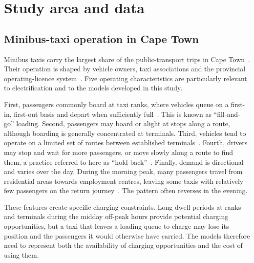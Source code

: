 \documentclass{elsarticle}
\begin{document}

\section{Study area and data}
\label{sec:study_area}

\subsection{Minibus-taxi operation in Cape Town}

Minibus taxis carry the largest share of the public-transport trips in Cape Town~\cite{statssa2022_nhts, coct2023_citp}. Their operation is shaped by vehicle owners, taxi associations and the provincial operating-licence system~\cite{behrens2015_paratransit, vegter2020_sa_mbt_industry}. Five operating characteristics are particularly relevant to electrification and to the models developed in this study.

First, passengers commonly board at taxi ranks, where vehicles queue on a first-in, first-out basis and depart when sufficiently full~\cite{behrens2015_paratransit}. This is known as ``fill-and-go'' loading. Second, passengers may board or alight at stops along a route, although boarding is generally concentrated at terminals. Third, vehicles tend to operate on a limited set of routes between established terminals~\cite{coct2021_taxiroutes, dupreez2019_paratransit_route_typology}. Fourth, drivers may stop and wait for more passengers, or move slowly along a route to find them, a practice referred to here as ``hold-back''~\cite{ndibatya2021_characterising_mbt_movement}. Finally, demand is directional and varies over the day. During the morning peak, many passengers travel from residential areas towards employment centres, leaving some taxis with relatively few passengers on the return journey~\cite{coct2023_citp}. The pattern often reverses in the evening.

These features create specific charging constraints. Long dwell periods at ranks and terminals during the midday off-peak hours provide potential charging opportunities, but a taxi that leaves a loading queue to charge may lose its position and the passengers it would otherwise have carried. The models therefore need to represent both the availability of charging opportunities and the cost of using them.
\end{document}
